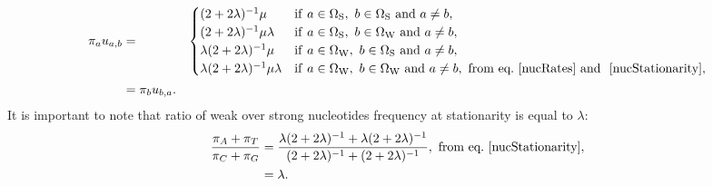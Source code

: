 \begin{align}
\pi_a u_{a, b}
& = &
\begin{cases}
( 2 + 2 \lambda)^{-1} \mu
& \mathrm{if} \ a \in \SetStrong, \ b \in \SetStrong \ \mathrm{ and } \ a \neq b,\\
( 2 + 2 \lambda)^{-1} \mu \lambda
& \mathrm{if} \ a \in \SetStrong, \ b \in \SetWeak \ \mathrm{ and } \ a \neq b, \\
\lambda  ( 2 + 2 \lambda)^{-1} \mu
& \mathrm{if} \ a \in \SetWeak, \ b \in \SetStrong \ \mathrm{ and } \ a \neq b,\\
\lambda ( 2 + 2 \lambda)^{-1} \mu \lambda
& \mathrm{if} \ a \in \SetWeak, \ b \in \SetWeak \ \mathrm{ and } \ a \neq b, \ \textrm{from eq.}\ \ref{nucRates} \text{ and } \ \ref{nucStationarity},
\end{cases} \\
& =\pi_b u_{b, a} .
\label{nucMutBalance}
\end{align}
It is important to note that ratio of weak over strong nucleotides frequency at stationarity is equal to $\lambda$:
\begin{align}
\label{lambda}
\dfrac{ \pi_A + \pi_T }{ \pi_C + \pi_G }
& =\dfrac{ \lambda ( 2 + 2 \lambda)^{-1} + \lambda ( 2 + 2 \lambda)^{-1}}{ ( 2 + 2 \lambda)^{-1} +  ( 2 + 2 \lambda)^{-1}}, \ \textrm{from eq.}\ \ref{nucStationarity},\\
& =\lambda .
\end{align}

